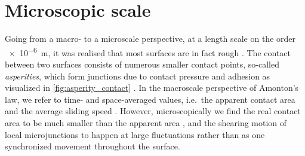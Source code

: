






\section{Microscopic scale}\label{sec:microscale}
Going from a macro- to a microscale perspective, at a length scale on the order
\SI{e-6}{m}, it was realised that most surfaces are in fact rough
\cite{mo_friction_2009}. The contact between two surfaces consists of numerous
smaller contact points, so-called \textit{asperities}, which form junctions due to contact pressure and adhesion as visualized in \cref{fig:asperity_contact} \cite{kim_nano-scale_2009}. In the macroscale perspective of Amonton's law, we refer to time- and space-averaged values, i.e.\ the apparent contact area and the average
sliding speed \cite{gao_frictional_2004}. However, microscopically we find the
real contact area to be much smaller than the apparent area \cite{kim_nano-scale_2009}, and the shearing motion of local microjunctions to happen at large fluctuations rather than as one synchronized movement throughout the surface. 

